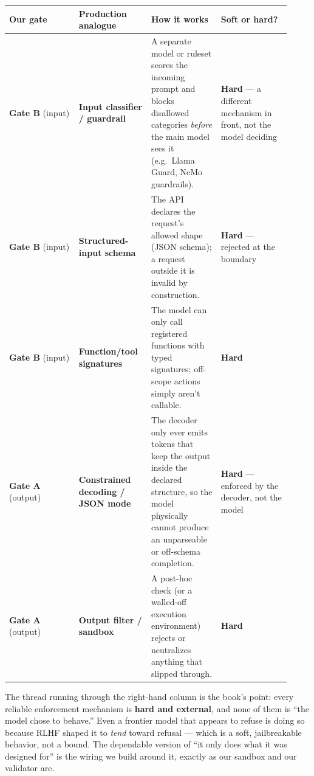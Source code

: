 \begin{longtable}[]{@{}
  >{\raggedright\arraybackslash}p{0.2300\linewidth}
>{\raggedright\arraybackslash}p{0.2300\linewidth}
>{\raggedright\arraybackslash}p{0.2300\linewidth}
>{\raggedright\arraybackslash}p{0.2300\linewidth}
@{}}
\toprule\noalign{}
\begin{minipage}[b]{\linewidth}\raggedright
Our gate
\end{minipage} & \begin{minipage}[b]{\linewidth}\raggedright
Production analogue
\end{minipage} & \begin{minipage}[b]{\linewidth}\raggedright
How it works
\end{minipage} & \begin{minipage}[b]{\linewidth}\raggedright
Soft or hard?
\end{minipage} \\
\midrule\noalign{}
\endhead
\bottomrule\noalign{}
\endlastfoot
\textbf{Gate B} (input) & \textbf{Input classifier / guardrail} & A
separate model or ruleset scores the incoming prompt and blocks
disallowed categories \emph{before} the main model sees it (e.g.~Llama
Guard, NeMo guardrails). & \textbf{Hard} --- a different mechanism in
front, not the model deciding \\
\textbf{Gate B} (input) & \textbf{Structured-input schema} & The API
declares the request's allowed shape (JSON schema); a request outside it
is invalid by construction. & \textbf{Hard} --- rejected at the
boundary \\
\textbf{Gate B} (input) & \textbf{Function/tool signatures} & The model
can only call registered functions with typed signatures; off-scope
actions simply aren't callable. & \textbf{Hard} \\
\textbf{Gate A} (output) & \textbf{Constrained decoding / JSON mode} &
The decoder only ever emits tokens that keep the output inside the
declared structure, so the model physically cannot produce an
unparseable or off-schema completion. & \textbf{Hard} --- enforced by
the decoder, not the model \\
\textbf{Gate A} (output) & \textbf{Output filter / sandbox} & A post-hoc
check (or a walled-off execution environment) rejects or neutralizes
anything that slipped through. & \textbf{Hard} \\
\end{longtable}

The thread running through the right-hand column is the book's point:
every reliable enforcement mechanism is \textbf{hard and external}, and
none of them is ``the model chose to behave.'' Even a frontier model
that appears to refuse is doing so because RLHF shaped it to \emph{tend}
toward refusal --- which is a soft, jailbreakable behavior, not a bound.
The dependable version of ``it only does what it was designed for'' is
the wiring we build around it, exactly as our sandbox and our validator
are.
